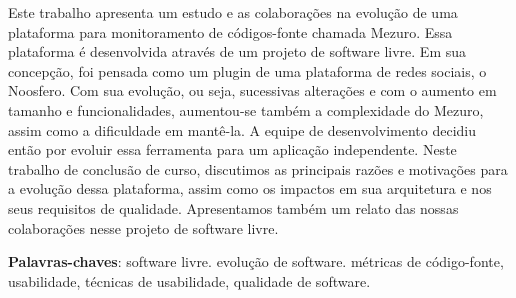 \begin{resumo}

Este trabalho apresenta um estudo e as colaborações na evolução de uma plataforma para monitoramento de códigos-fonte chamada Mezuro. Essa plataforma é desenvolvida através de um projeto de software livre. Em sua concepção, foi pensada como um plugin de uma plataforma de redes sociais, o Noosfero.
%
Com sua evolução, ou seja, sucessivas alterações e com o aumento em tamanho e funcionalidades, aumentou-se também a complexidade do Mezuro, assim como a dificuldade em mantê-la. A equipe de desenvolvimento decidiu então por evoluir essa ferramenta para um aplicação independente.
%
Neste trabalho de conclusão de curso, discutimos as principais razões e motivações para a evolução dessa plataforma, assim como os impactos em sua arquitetura e nos seus requisitos de qualidade.
%
Apresentamos também um relato das nossas colaborações nesse projeto de software livre.
 \vspace{\onelineskip}
    
 \noindent
 \textbf{Palavras-chaves}: software livre. evolução de software. métricas de código-fonte, usabilidade, técnicas de usabilidade, qualidade de software.
\end{resumo}
